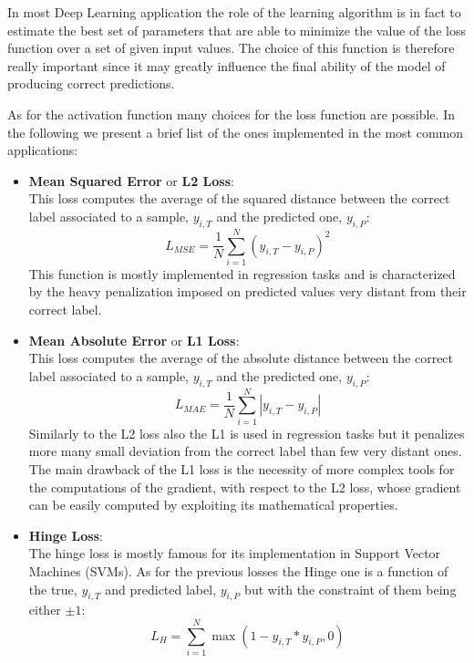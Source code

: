 \documentclass[../../main.tex]{subfiles}
\begin{document}
In most Deep Learning application the role of the learning algorithm is in fact to estimate the best set of parameters that are able to minimize the value of the loss function over a set of given input values. The choice of this function is therefore really important since it may greatly influence the final ability of the model of producing correct predictions.

As for the activation function many choices for the loss function are possible. In the following we present a brief list of the ones implemented in the most common applications:
\begin{itemize}
    \item \textbf{Mean Squared Error} or \textbf{L2 Loss}:\\
    This loss computes the average of the squared distance between the correct label associated to a sample, $y_{i,T}$ and the predicted one, $y_{i,P}$:
    \begin{equation}
        L_{MSE}= \frac{1}{N}\sum_{i=1}^N \left(y_{i,T}-y_{i,P}\right)^2
    \end{equation}
    This function is mostly implemented in regression tasks and is characterized by the heavy penalization imposed on predicted values very distant from their correct label. 
    \item \textbf{Mean Absolute Error} or \textbf{L1 Loss}:\\
    This loss computes the average of the absolute distance between the correct label associated to a sample, $y_{i,T}$ and the predicted one, $y_{i,P}$:
    \begin{equation}
        L_{MAE}= \frac{1}{N}\sum_{i=1}^N \left|y_{i,T}-y_{i,P}\right|
    \end{equation}
    Similarly to the L2 loss also the L1 is used in regression tasks but it penalizes more many small deviation from the correct label than few very distant ones. The main drawback of the L1 loss is the necessity of more complex tools for the computations of the gradient, with respect to the L2 loss, whose gradient can be easily computed by exploiting its mathematical properties. 
\item \textbf{Hinge Loss}:\\
    The hinge loss is mostly famous for its implementation in Support Vector Machines (SVMs). As for the previous losses the Hinge one is a function of the true, $y_{i,T}$ and  predicted label, $y_{i,P}$ but with the constraint of them being either $\pm 1$:
    \begin{equation}
        L_{H}= \sum_{i=1}^N \max\left( 1-y_{i,T}*y_{i,P},0\right)

\end{equation}
\end{itemize}
\end{document}
